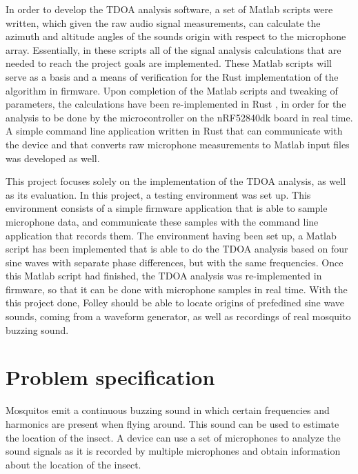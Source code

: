 \documentclass[a4paper]{article}
\begin{document}
In order to develop the TDOA analysis software, a set of Matlab \cite{matlab} scripts were written, which given the raw audio signal measurements, can calculate the azimuth and altitude angles of the sounds origin with respect to the microphone array. Essentially, in these scripts all of the signal analysis calculations that are needed to reach the project goals are implemented. These Matlab scripts will serve as a basis and a means of verification for the Rust implementation of the algorithm in firmware. Upon completion of the Matlab scripts and tweaking of parameters, the calculations have been re-implemented in Rust \cite{rust}, in order for the analysis to be done by the microcontroller on the nRF52840dk \cite{nrf52840-dk} board in real time. A simple command line application written in Rust that can communicate with the device and that converts raw microphone measurements to Matlab input files was developed as well.

This project focuses solely on the implementation of the TDOA analysis, as well as its evaluation. In this project, a testing environment was set up. This environment consists of a simple firmware application that is able to sample microphone data, and communicate these samples with the command line application that records them. The environment having been set up, a Matlab script has been implemented that is able to do the TDOA analysis based on four sine waves with separate phase differences, but with the same frequencies. Once this Matlab script had finished, the TDOA analysis was re-implemented in firmware, so that it can be done with microphone samples in real time. With the this project done, Folley should be able to locate origins of prefedined sine wave sounds, coming from a waveform generator, as well as recordings of real mosquito buzzing sound.


\section{Problem specification}
Mosquitos emit a continuous buzzing sound in which certain frequencies and harmonics are present when flying around. This sound can be used to estimate the location of the insect. A device can use a set of microphones to analyze the sound signals as it is recorded by multiple microphones and obtain information about the location of the insect.
\end{document}
